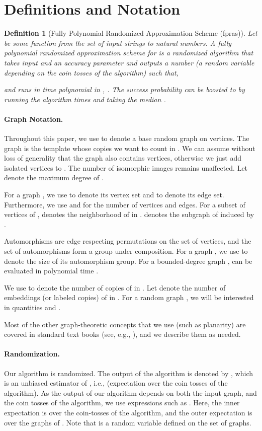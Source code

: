 \documentclass[11pt]{article}
\newtheorem{definition}[theorem]{Definition}
\begin{document}
\section{Definitions and Notation} \label{sec:def}
\begin{definition} [Fully Polynomial Randomized Approximation Scheme (fpras)]
Let  be some function from the set of input strings  to natural numbers. A fully polynomial randomized approximation scheme for  is a randomized algorithm that takes input  and an accuracy parameter  and outputs a number  (a random variable depending on the coin tosses of the algorithm) such that, 
 
and runs in time polynomial in , . The success probability can be boosted to  by running the algorithm  times and taking the median \cite{vazirani}. 
\end{definition}

\paragraph{Graph Notation.}
Throughout this paper, we use  to denote a base random graph on  vertices.  The graph  is the template whose copies we want to count in . We can assume without loss of generality that the graph  also contains  vertices, otherwise we just add isolated vertices to . The number of isomorphic images remains unaffected. Let  denote the maximum degree of .

For a graph , we use  to denote its vertex set and  to denote its edge set. Furthermore, we use  and  for the number of vertices and edges. For a subset  of vertices of ,  denotes the neighborhood of  in .  denotes the subgraph of  induced by . 

Automorphisms are edge respecting permutations on the set of vertices, and the set of automorphisms form a group under composition. For a graph , we use  to denote the size of its automorphism group. For a bounded-degree graph ,  can be evaluated in polynomial time \cite{luks}.

We use  to denote the number of copies of  in . Let  denote the number of embeddings (or labeled copies) of  in . For a random graph , we will be interested in quantities  and . 

 Most of the other graph-theoretic concepts that we use (such as planarity) are covered in standard text books (see, e.g., \cite{diestel}), and we describe them as needed. 

\paragraph{Randomization.} Our algorithm is randomized. The output of the algorithm is denoted by , which is an unbiased estimator of , i.e.,  (expectation over the coin tosses of the algorithm). As the output of our algorithm depends on both the input graph, and the coin tosses of the algorithm, we use expressions such as . Here, the inner expectation is over the coin-tosses of the algorithm, and the outer expectation is over the graphs of . Note that  is a random variable defined on the set of graphs. 
\end{document}
